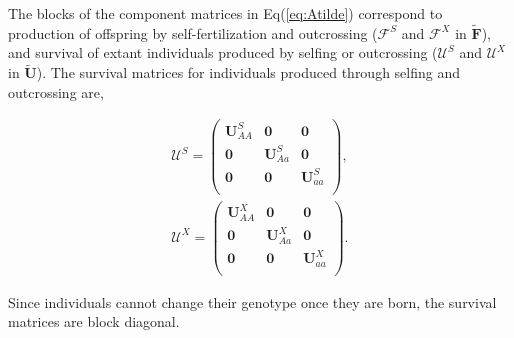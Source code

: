 \documentclass[11pt]{article}
\def\mbf#1{\mathbf{#1}}
\def\mcal#1{\mathcal{#1}}
\begin{document}
The blocks of the component matrices in Eq(\ref{eq:Atilde}) correspond to production of offspring by self-fertilization and outcrossing ($\mcal{F}^S$ and $\mcal{F}^X$ in $\tilde{\mbf{F}}$), and survival of extant individuals produced by selfing or outcrossing ($\mcal{U}^S$ and $\mcal{U}^X$ in $\tilde{\mbf{U}}$). The survival matrices for individuals produced through selfing and outcrossing are,
\begin{linenomath*}
\begin{eqnarray} 
	\mcal{U}^S  = 
		\left(
			\begin{array}{ccc}
				\mbf{U}^{S}_{AA} & \mbf{0} & \mbf{0} \\
				\mbf{0} & \mbf{U}^{S}_{Aa} & \mbf{0} \\
				\mbf{0} & \mbf{0} & \mbf{U}^{S}_{aa} \\
			\end{array} \right),\label{eq:BlkUS}\\
				\mcal{U}^X  = 
		\left(
			\begin{array}{ccc}
				\mbf{U}^{X}_{AA} & \mbf{0} & \mbf{0} \\
				\mbf{0} & \mbf{U}^{X}_{Aa} & \mbf{0} \\
				\mbf{0} & \mbf{0} & \mbf{U}^{X}_{aa} \\
			\end{array} \right).\label{eq:BlkUX}
\end{eqnarray}
\end{linenomath*}
Since individuals cannot change their genotype once they are born, the survival matrices are block diagonal.  
\end{document}
